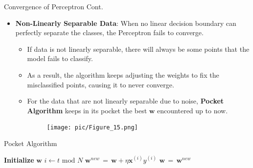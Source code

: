 \documentclass[serif, aspectratio=169]{beamer}
\begin{document}
\begin{frame}{Convergence of Perceptron Cont.}
    \begin{itemize}\itemsep1.5em
        \item \textbf{Non-Linearly Separable Data}:
        When no linear decision boundary can perfectly separate the classes, the Perceptron fails to converge.
        \medskip
        \begin{itemize}\itemsep1em
            \item If data is not linearly separable, there will always be some points that the model fails to classify.
            \item As a result, the algorithm keeps adjusting the weights to fix the misclassified points, causing it to never converge.
            \item For the data that are not linearly separable due to noise, \textbf{Pocket Algorithm} keeps in its pocket the best \(\mathbf{w}\) encountered up to now.
        \endminipage
        \hspace{1.5cm}
        \begin{figure}
            \centering
            \texttt{[image: pic/Figure\_15.png]}
        \end{figure}
        \endminipage
        \end{itemize}
    \end{itemize}
    \vfill
\end{frame}

\begin{frame}{Pocket Algorithm}
    \begin{algorithm}[H]
    \caption{Pocket Algorithm}\label{alg:Pocket Algorithm}
    \begin{algorithmic}[1]
        \State \textbf{Initialize} $\mathbf{w}$
            \State \(i \leftarrow t \text{ mod } N\)
            \State \(\mathbf{w}^{new} \, = \, \mathbf{w} + \eta \mathbf{x}^{(i)}y^{(i)}\)
             
            \State \(\mathbf{w} \, = \, \mathbf{w}^{new}\)
            \EndIf
            \EndIf
        \EndFor
    \end{algorithmic}
    \end{algorithm}
\end{frame}
\end{document}
